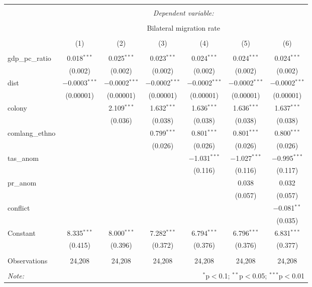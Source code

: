 
\begin{table}[!htbp] \centering 
  \caption{} 
  \label{} 
\begin{tabular}{@{\extracolsep{0pt}}lcccccc} 
\\[-1.8ex]\hline 
\hline \\[-1.8ex] 
 & \multicolumn{6}{c}{\textit{Dependent variable:}} \\ 
\cline{2-7} 
\\[-1.8ex] & \multicolumn{6}{c}{Bilateral migration rate} \\ 
\\[-1.8ex] & (1) & (2) & (3) & (4) & (5) & (6)\\ 
\hline \\[-1.8ex] 
 gdp\_pc\_ratio & 0.018$^{***}$ & 0.025$^{***}$ & 0.023$^{***}$ & 0.024$^{***}$ & 0.024$^{***}$ & 0.024$^{***}$ \\ 
  & (0.002) & (0.002) & (0.002) & (0.002) & (0.002) & (0.002) \\ 
  dist & $-$0.0003$^{***}$ & $-$0.0002$^{***}$ & $-$0.0002$^{***}$ & $-$0.0002$^{***}$ & $-$0.0002$^{***}$ & $-$0.0002$^{***}$ \\ 
  & (0.00001) & (0.00001) & (0.00001) & (0.00001) & (0.00001) & (0.00001) \\ 
  colony &  & 2.109$^{***}$ & 1.632$^{***}$ & 1.636$^{***}$ & 1.636$^{***}$ & 1.637$^{***}$ \\ 
  &  & (0.036) & (0.038) & (0.038) & (0.038) & (0.038) \\ 
  comlang\_ethno &  &  & 0.799$^{***}$ & 0.801$^{***}$ & 0.801$^{***}$ & 0.800$^{***}$ \\ 
  &  &  & (0.026) & (0.026) & (0.026) & (0.026) \\ 
  tas\_anom &  &  &  & $-$1.031$^{***}$ & $-$1.027$^{***}$ & $-$0.995$^{***}$ \\ 
  &  &  &  & (0.116) & (0.116) & (0.117) \\ 
  pr\_anom &  &  &  &  & 0.038 & 0.032 \\ 
  &  &  &  &  & (0.057) & (0.057) \\ 
  conflict &  &  &  &  &  & $-$0.081$^{**}$ \\ 
  &  &  &  &  &  & (0.035) \\ 
  Constant & 8.335$^{***}$ & 8.000$^{***}$ & 7.282$^{***}$ & 6.794$^{***}$ & 6.796$^{***}$ & 6.831$^{***}$ \\ 
  & (0.415) & (0.396) & (0.372) & (0.376) & (0.376) & (0.377) \\ 
 \hline \\[-1.8ex] 
Observations & 24,208 & 24,208 & 24,208 & 24,208 & 24,208 & 24,208 \\ 
\hline 
\hline \\[-1.8ex] 
\textit{Note:}  & \multicolumn{6}{r}{$^{*}$p$<$0.1; $^{**}$p$<$0.05; $^{***}$p$<$0.01} \\ 
\end{tabular} 
\end{table} 
